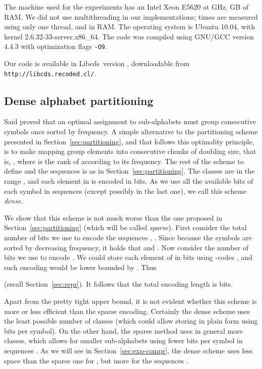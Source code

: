 \documentclass[11pt]{article}
\newcommand{\libcds}{{\sc Libcds}}
\begin{document}
\begin{table}[t]
{\begin{tabular}
The machine used for the experiments has an
Intel\textsuperscript{\textregistered}
Xeon\textsuperscript{\textregistered} E5620 at GHz, GB of
RAM. We did not use multithreading in our implementations; times
are measured using only one thread, and in RAM.
The operating system is Ubuntu 10.04, with
kernel 2.6.32-33-server.x86\_64. The code was compiled using GNU/GCC
version 4.4.3 with optimization flags \verb|-O9|.

Our code is available in \libcds\ version , downloadable
from \verb|http://libcds.recoded.cl/|.
 

\subsection{Dense alphabet partitioning}
\label{sec:dense}

Said \cite{Sai05} proved that an optimal assignment to sub-alphabets must
group consecutive symbols once sorted by frequency. A simple alternative
to the partitioning scheme presented in Section~\ref{sec:partitioning}, and
that follows this optimality principle, is to make mapping  
group elements into consecutive chunks of doubling size, that
is, , where  is the
rank of  according to its frequency. 
The rest of the scheme to define  and the sequences
 is as in Section~\ref{sec:partitioning}. The
classes are in the range ,
and each element in  is encoded in  bits. As we use all the
available bits of each symbol in sequences  (except possibly in the
last one), we call this scheme {\em dense}.

We show that this scheme is not much worse than the one proposed in
Section~\ref{sec:partitioning} (which will be called {\em sparse}). 
First consider the total number of bits we use to encode the sequences 
, .
Since  because the symbols are sorted by decreasing
frequency, it holds that  and 
.
Now consider the number of bits we use to encode 
.  
We could store each element  of  in 
 bits using
-codes \cite{WMB99}, and such encoding would be lower bounded by 
. Thus

(recall Section~\ref{sec:repr}). It follows that the total encoding length is
 bits.

Apart from the pretty tight upper bound, it is not evident whether this scheme 
is more or less efficient than the sparse encoding. Certainly the dense scheme 
uses the least possible number of classes (which could allow storing  in 
plain form using  bits per symbol). On the other hand, the sparse
method uses in general more classes, which allows for smaller sub-alphabets 
using fewer bits per symbol in sequences . As we will see in 
Section~\ref{sec:exp-compr}, the dense scheme uses less space than the sparse 
one for , but more for the sequences .


\end{tabular}}
\end{table}
\end{document}
